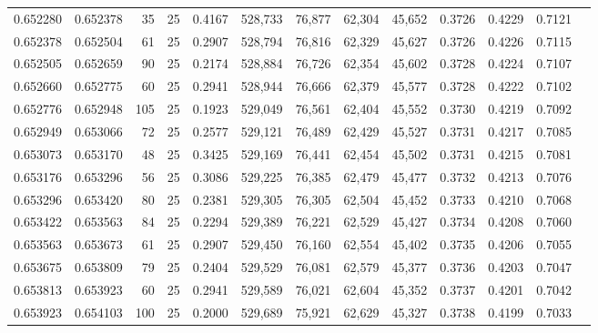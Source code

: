 \begin{tabular}{rrrrrrrrrrrrr}
0.652280 & 0.652378 &    35 &  25 &                                     0.4167 & 528,733 &  76,877 &  62,304 &  45,652 & 0.3726 & 0.4229 & 0.7121 \\
0.652378 & 0.652504 &    61 &  25 &                                     0.2907 & 528,794 &  76,816 &  62,329 &  45,627 & 0.3726 & 0.4226 & 0.7115 \\
0.652505 & 0.652659 &    90 &  25 &                                     0.2174 & 528,884 &  76,726 &  62,354 &  45,602 & 0.3728 & 0.4224 & 0.7107 \\
0.652660 & 0.652775 &    60 &  25 &                                     0.2941 & 528,944 &  76,666 &  62,379 &  45,577 & 0.3728 & 0.4222 & 0.7102 \\
0.652776 & 0.652948 &   105 &  25 &                                     0.1923 & 529,049 &  76,561 &  62,404 &  45,552 & 0.3730 & 0.4219 & 0.7092 \\
0.652949 & 0.653066 &    72 &  25 &                                     0.2577 & 529,121 &  76,489 &  62,429 &  45,527 & 0.3731 & 0.4217 & 0.7085 \\
0.653073 & 0.653170 &    48 &  25 &                                     0.3425 & 529,169 &  76,441 &  62,454 &  45,502 & 0.3731 & 0.4215 & 0.7081 \\
0.653176 & 0.653296 &    56 &  25 &                                     0.3086 & 529,225 &  76,385 &  62,479 &  45,477 & 0.3732 & 0.4213 & 0.7076 \\
0.653296 & 0.653420 &    80 &  25 &                                     0.2381 & 529,305 &  76,305 &  62,504 &  45,452 & 0.3733 & 0.4210 & 0.7068 \\
0.653422 & 0.653563 &    84 &  25 &                                     0.2294 & 529,389 &  76,221 &  62,529 &  45,427 & 0.3734 & 0.4208 & 0.7060 \\
0.653563 & 0.653673 &    61 &  25 &                                     0.2907 & 529,450 &  76,160 &  62,554 &  45,402 & 0.3735 & 0.4206 & 0.7055 \\
0.653675 & 0.653809 &    79 &  25 &                                     0.2404 & 529,529 &  76,081 &  62,579 &  45,377 & 0.3736 & 0.4203 & 0.7047 \\
0.653813 & 0.653923 &    60 &  25 &                                     0.2941 & 529,589 &  76,021 &  62,604 &  45,352 & 0.3737 & 0.4201 & 0.7042 \\
0.653923 & 0.654103 &   100 &  25 &                                     0.2000 & 529,689 &  75,921 &  62,629 &  45,327 & 0.3738 & 0.4199 & 0.7033 \\

\end{tabular}
